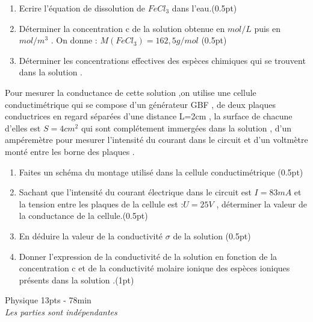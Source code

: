 \documentclass[12pt]{article}
\begin{document}
\begin{enumerate}
    \item Ecrire l’équation de dissolution de $FeCl_3$ dans l’eau.\dotfill(0.5pt)
    \item Déterminer la concentration c de la solution obtenue en $mol/L$ puis en $mol/m^3$ . On  donne :  $ M( FeCl_3 )=162,5g/mol$ \dotfill(0.5pt)
    \item Déterminer les concentrations effectives des espèces chimiques qui se trouvent dans la solution .\dotfill{0.5pt}
\end{enumerate}
Pour mesurer la conductance de cette solution ,on utilise une cellule conductimétrique qui se compose d’un générateur GBF ,
de deux plaques conductrices en regard séparées d’une distance L=2cm , la surface de chacune d’elles est  $S=4cm^2$ qui sont complétement immergées dans la solution , d’un ampéremètre pour mesurer l’intensité du courant dans le circuit et d’un voltmètre monté entre les borne des plaques .

\begin{enumerate}

  \item Faites un schéma du montage utilisé dans la cellule conductimétrique \dotfill(0.5pt)
  \item Sachant que l’intensité du courant électrique dans le circuit est $I=83mA$ et la tension entre les plaques de la cellule est :$U=25V$ , déterminer la valeur de la conductance de la cellule.\dotfill(0.5pt)
  \item En déduire la valeur de la conductivité $\sigma$ de la solution \dotfill(0.5pt)
  \item   Donner l’expression de la conductivité de la solution en fonction de la concentration c et de la conductivité molaire
    ionique des espèces ioniques présents dans la solution .\dotfill(1pt)
\end{enumerate}
\begin{center}
    \vspace{2cm}
\hrulefill
\Large{Physique 13pts - 78min}
\hrulefill\\
    \emph{Les parties sont indépendantes}
\end{center}
\end{document}
